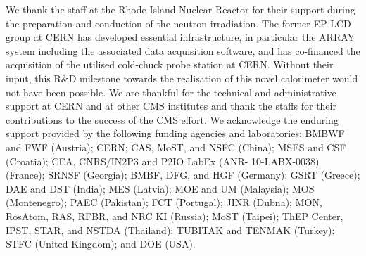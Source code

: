 \acknowledgments
We thank the staff at the Rhode Island Nuclear Reactor for their support during the preparation and conduction of the neutron irradiation.
The former EP-LCD group at CERN has developed essential infrastructure, in particular the ARRAY system including the associated data acquisition software, and has co-financed the acquisition of the utilised cold-chuck probe station at CERN.
Without their input, this R$\&$D milestone towards the realisation of this novel calorimeter would not have been possible. 
We are thankful for the technical and administrative support at CERN and at other CMS institutes and thank the staffs for their contributions to the success of the CMS effort. 
We acknowledge the enduring support provided by the following funding agencies and laboratories: BMBWF and FWF (Austria); CERN; CAS, MoST, and NSFC (China); MSES and CSF (Croatia); CEA, CNRS/IN2P3 and P2IO LabEx (ANR- 10-LABX-0038) (France); SRNSF (Georgia); BMBF, DFG, and HGF (Germany); GSRT (Greece); DAE and DST (India); MES (Latvia); MOE and UM (Malaysia); MOS (Montenegro); PAEC (Pakistan); FCT (Portugal); JINR (Dubna); MON, RosAtom, RAS, RFBR, and NRC KI (Russia); MoST (Taipei); ThEP Center, IPST, STAR, and NSTDA (Thailand); TUBITAK and TENMAK (Turkey); STFC (United Kingdom); and DOE (USA).

